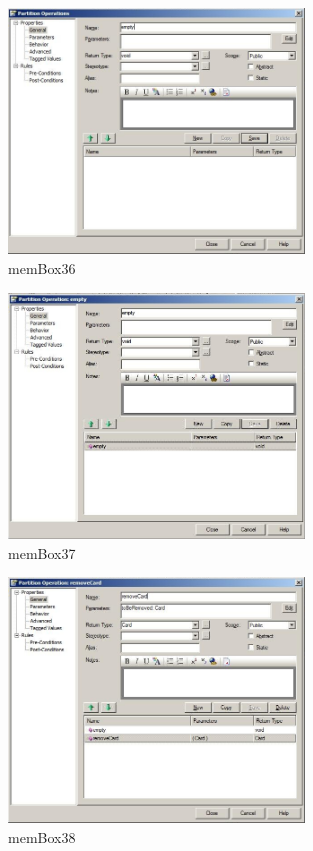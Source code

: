 \begin{figure}[htbp]
	\centering
  \includegraphics[width=0.7\textwidth]{pics/memBox36.png}
	\caption{memBox36}
	\label{memBox36}
\end{figure}

\begin{figure}[htbp]
	\centering
  \includegraphics[width=0.7\textwidth]{pics/memBox37.png}
	\caption{memBox37}
	\label{memBox37}
\end{figure}

\begin{figure}[htbp]
	\centering
  \includegraphics[width=0.7\textwidth]{pics/memBox38.png}
	\caption{memBox38}
	\label{memBox38}
\end{figure}

